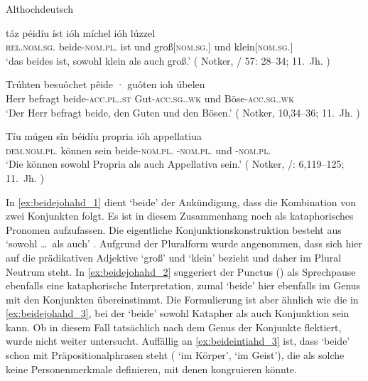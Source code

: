 
\begin{exe}
\ex \label{ex:beidejohahd}
	\langinfo%
		{Althochdeutsch}
		{}
		{\cite{ddd}}
	\begin{xlist}
	\ex \label{ex:beidejohahd_1}
		\gll táz péidíu íst ióh míchel ióh lúzzel \\
			\textsc{rel.nom.sg.\NeutI} beide-\textsc{nom.pl.\NeutI} ist und
			groß[\textsc{nom.sg.\NeutI}] und klein[\textsc{nom.sg.\NeutI}] \\
		\trans `das beides ist, sowohl klein als auch groß.'
			(%
				Notker, / 57: 28--34;
				11.~Jh.%
			)

	\ex \label{ex:beidejohahd_2}
		\gll Trúhten besuôchet pêide · guôten ioh
				úbelen \\
			Herr befragt beide-\textsc{acc.pl.\MascA.st} {}
				Gut-\textsc{acc.sg.\MascA.wk} und
				Böse-\textsc{acc.sg.\MascA.wk} \\
		\trans `Der Herr befragt beide, den Guten und den Bösen.'
			(%
				Notker,  10,34--36;
				11.~Jh.%
			)

	\ex \label{ex:beidejohahd_3}
		\gll Tíu múgen sîn béidíu propria ióh appellatiua \\
			\textsc{dem.nom.pl.\NeutI} können sein beide-\textsc{nom.pl.\NeutI}
				-\textsc{nom.pl.\NeutI} und
				-\textsc{nom.pl.\NeutI} \\
		\trans `Die können sowohl Propria als auch Appellativa sein.'
			(%
				Notker, /: 6,119--125;
				11.~Jh.%
			)
	\end{xlist}
\end{exe}

In \cref{ex:beidejohahd_1} dient  `beide' der Ankündigung, dass die
Kombination von zwei Konjunkten folgt. Es ist in diesem Zusammenhang noch als
kataphorisches Pronomen aufzufassen. Die eigentliche Konjunktionskonstruktion
besteht aus  `sowohl \dots\ als auch'
\autocite[vgl.][169]{schuetzeichel2012}. Aufgrund der Pluralform wurde
angenommen, dass  sich hier auf die prädikativen Adjektive
 `groß' und 
`klein' bezieht und daher im Plural Neutrum steht. In \cref{ex:beidejohahd_2}
suggeriert der Punctus () als Sprechpause ebenfalls eine kataphorische
Interpretation, zumal  `beide' hier ebenfalls im Genus mit den
Konjunkten übereinstimmt. Die Formulierung ist aber ähnlich wie die in
\cref{ex:beidejohahd_3}, bei der  `beide' sowohl Katapher als auch
Konjunktion sein kann. Ob  in diesem Fall tatsächlich nach dem
Genus der Konjunkte flektiert, wurde nicht weiter untersucht. Auffällig an
\cref{ex:beideintiahd_3} ist, dass  `beide' schon mit
Präpositionalphrasen steht ( `im Körper',  `im Geist'), die als solche keine Personenmerkmale definieren, mit denen
 kongruieren könnte.

